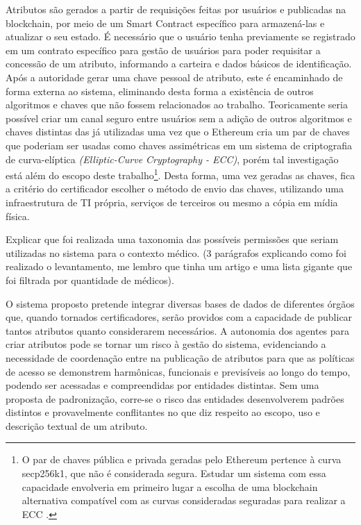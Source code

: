 \documentclass[a4paper,11pt]{article}
\begin{document}
Atributos são gerados a partir de requisições feitas por usuários e publicadas na blockchain, por meio de um Smart Contract específico para armazená-las e atualizar o seu estado.
É necessário que o usuário tenha previamente se registrado em um contrato específico para gestão de usuários para poder requisitar a concessão de um atributo, informando a carteira e dados básicos de identificação.
Após a autoridade gerar uma chave pessoal de atributo, este é encaminhado de forma externa ao sistema, eliminando desta forma a existência de outros algoritmos e chaves que não fossem relacionados ao trabalho.
Teoricamente seria possível criar um canal seguro entre usuários sem a adição de outros algoritmos e chaves distintas das já utilizadas uma vez que o Ethereum cria um par de chaves que poderiam ser usadas como chaves assimétricas em um sistema de criptografia de curva-elíptica \emph{(Elliptic-Curve Cryptography - ECC)}, porém tal investigação está além do escopo deste trabalho\footnote{O par de chaves pública e privada geradas pelo Ethereum pertence à curva secp256k1, que não é considerada segura.
Estudar um sistema com essa capacidade envolveria em primeiro lugar a escolha de uma blockchain alternativa compatível com as curvas consideradas seguradas para realizar a ECC \cite{Bernstein2017}.}.
Desta forma, uma vez geradas as chaves, fica a critério do certificador escolher o método de envio das chaves, utilizando uma infraestrutura de TI própria, serviços de terceiros ou mesmo a cópia em mídia física.

{\color{ForestGreen}Explicar que foi realizada uma taxonomia das possíveis permissões que seriam utilizadas no sistema para o contexto médico. (3 parágrafos explicando como foi realizado o levantamento, me lembro que tinha um artigo e uma lista gigante que foi filtrada por quantidade de médicos).}

O sistema proposto pretende integrar diversas bases de dados de diferentes órgãos que, quando tornados  certificadores, serão providos com a capacidade de publicar tantos atributos quanto considerarem necessários.
A autonomia dos agentes para criar atributos pode se tornar um risco à gestão do sistema, evidenciando a necessidade de coordenação entre na publicação de atributos para que as  políticas de acesso se demonstrem harmônicas, funcionais e previsíveis ao longo do tempo, podendo ser acessadas e compreendidas por entidades distintas.
Sem uma proposta de padronização, corre-se o risco das entidades desenvolverem padrões distintos e provavelmente conflitantes no que diz respeito ao escopo, uso e descrição textual de um atributo.
\end{document}
